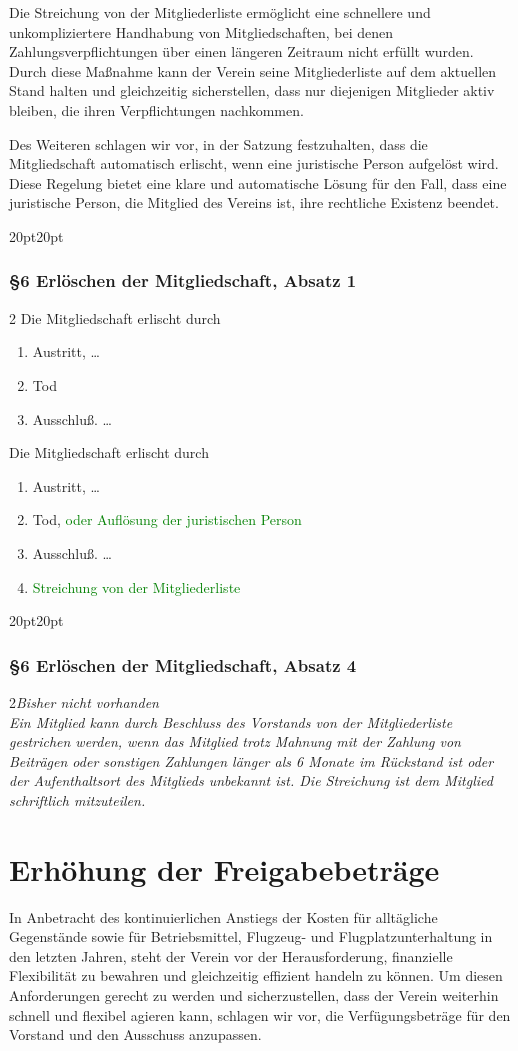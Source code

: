 \documentclass[10pt,a4paper,parskip=half]{scrartcl}
\newcommand{\new}[1]{\textcolor{Green}{#1}}
\newcommand{\change}[1]{
  \begin{adjustwidth}{20pt}{20pt}
    #1
  \end{adjustwidth}
}
\newcommand{\compare}[3]{\change{\subsubsection*{#1}\begin{multicols}{2}#2\columnbreak\\#3\end{multicols}}}
\begin{document}
Die Streichung von der Mitgliederliste ermöglicht eine schnellere und unkompliziertere Handhabung von Mitgliedschaften, bei denen Zahlungsverpflichtungen über einen längeren Zeitraum nicht erfüllt wurden. Durch diese Maßnahme kann der Verein seine Mitgliederliste auf dem aktuellen Stand halten und gleichzeitig sicherstellen, dass nur diejenigen Mitglieder aktiv bleiben, die ihren Verpflichtungen nachkommen.

Des Weiteren schlagen wir vor, in der Satzung festzuhalten, dass die Mitgliedschaft automatisch erlischt, wenn eine juristische Person aufgelöst wird. Diese Regelung bietet eine klare und automatische Lösung für den Fall, dass eine juristische Person, die Mitglied des Vereins ist, ihre rechtliche Existenz beendet.

\change{
  \subsubsection*{§6 Erlöschen der Mitgliedschaft, Absatz 1}
  \begin{multicols}{2}
    Die Mitgliedschaft erlischt durch
    \begin{enumerate}[label=\alph*)]
      \item Austritt, \dots
      \item Tod
      \item{Ausschluß.} \dots
    \end{enumerate}
    \columnbreak
    Die Mitgliedschaft erlischt durch
    \begin{enumerate}[label=\alph*)]
      \item Austritt, \dots
      \item Tod, \new{oder Auflösung der juristischen Person}
      \item{Ausschluß.} \dots
      \item \new{Streichung von der Mitgliederliste}
    \end{enumerate}
  \end{multicols}
}
\compare{§6 Erlöschen der Mitgliedschaft, Absatz 4}{\em Bisher nicht vorhanden \em}{Ein Mitglied kann durch Beschluss des Vorstands von der Mitgliederliste gestrichen werden,
wenn das Mitglied trotz Mahnung mit der Zahlung von Beiträgen oder sonstigen Zahlungen länger als 6 Monate im Rückstand ist oder der Aufenthaltsort des Mitglieds unbekannt ist.
  Die Streichung ist dem Mitglied schriftlich mitzuteilen.}

\clearpage
\section{Erhöhung der Freigabebeträge}
In Anbetracht des kontinuierlichen Anstiegs der Kosten für alltägliche Gegenstände sowie für Betriebsmittel, Flugzeug- und Flugplatzunterhaltung in den letzten Jahren, steht der Verein vor der Herausforderung, finanzielle Flexibilität zu bewahren und gleichzeitig effizient handeln zu können. Um diesen Anforderungen gerecht zu werden und sicherzustellen, dass der Verein weiterhin schnell und flexibel agieren kann, schlagen wir vor, die Verfügungsbeträge für den Vorstand und den Ausschuss anzupassen.
\end{document}
